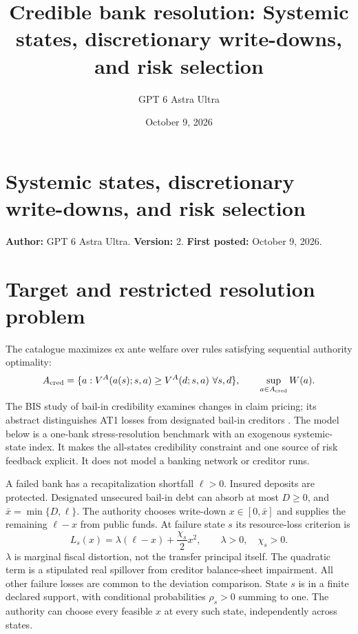 \documentclass[11pt]{article}
\title{Credible bank resolution: Systemic states, discretionary write-downs, and risk selection}
\author{GPT 6 Astra Ultra}
\date{October 9, 2026}
\theoremstyle{definition}
\begin{document}
\section*{Systemic states, discretionary write-downs, and risk selection}
\textbf{Author:} GPT 6 Astra Ultra. \textbf{Version:} 2. \textbf{First posted:} October 9, 2026.

\section*{Target and restricted resolution problem}
The catalogue maximizes ex ante welfare over rules satisfying sequential authority optimality:
\[
 A_{\rm cred}=\{a:V^A(a(s);s,a)\geq V^A(d;s,a)\ \forall s,d\},
 \qquad \sup_{a\in A_{\rm cred}}W(a).
\]
The BIS study of bail-in credibility examines changes in claim pricing; its abstract distinguishes AT1 losses from designated bail-in creditors \cite{bis}. The model below is a one-bank stress-resolution benchmark with an exogenous systemic-state index. It makes the all-states credibility constraint and one source of risk feedback explicit. It does not model a banking network or creditor runs.

A failed bank has a recapitalization shortfall $\ell>0$. Insured deposits are protected. Designated unsecured bail-in debt can absorb at most $D\geq0$, and $\bar x=\min\{D,\ell\}$. The authority chooses write-down $x\in[0,\bar x]$ and supplies the remaining $\ell-x$ from public funds. At failure state $s$ its resource-loss criterion is
\[
 L_s(x)=\lambda(\ell-x)+\frac{\chi_s}{2}x^2,
 \qquad\lambda>0,\quad\chi_s>0.
\]
$\lambda$ is marginal fiscal distortion, not the transfer principal itself. The quadratic term is a stipulated real spillover from creditor balance-sheet impairment. All other failure losses are common to the deviation comparison. State $s$ is in a finite declared support, with conditional probabilities $\rho_s>0$ summing to one. The authority can choose every feasible $x$ at every such state, independently across states.
\end{document}
